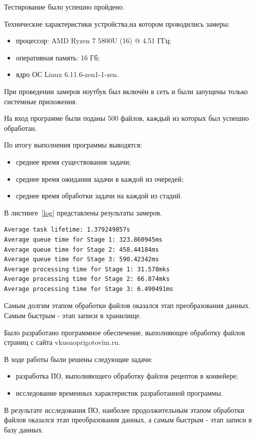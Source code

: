 Тестирование было успешно пройдено.

\clearpage
{}

Технические характеристики устройства,на котором проводились замеры:

\begin{itemize}
	\item процессор: AMD Ryzen 7 5800U (16) @ 4.51 ГГц;
	\item оперативная память: 16 Гб;
	\item ядро ОС Linux 6.11.6-zen1-1-zen.
\end{itemize}

При проведении замеров ноутбук был включён в сеть и были запущены только системные приложения.

На вход программе были поданы 500 файлов, каждый из которых был успешно обработан.

По итогу выполнения программы выводятся:

\begin{itemize}
    \item среднее время существования задачи;
    \item среднее время ожидания задачи в каждой из очередей;
    \item среднее время обработки задачи на каждой из стадий.
\end{itemize}

В листинге~\ref{log} представлены результаты замеров.

\begin{lstlisting}[label=log,caption={Данные журналирования}]
Average task lifetime: 1.379249857s
Average queue time for Stage 1: 323.860945ms
Average queue time for Stage 2: 458.44184ms
Average queue time for Stage 3: 590.42342ms
Average processing time for Stage 1: 31.578mks
Average processing time for Stage 2: 66.874mks
Average processing time for Stage 3: 6.490491ms
\end{lstlisting}

Самым долгим этапом обработки файлов оказался этап преобразования данных. Самым быстрым - этап записи в хранилище.

\clearpage
{}

Было разработано программное обеспечение, выполняющее обработку файлов страниц с сайта vkusnoprigotovim.ru.

В ходе работы были решены следующие задачи:

\begin{itemize}
	\item разработка ПО, выполняющего обработку файлов рецептов в конвейере;
    \item исследование временных характеристик разработанной программы.
\end{itemize}

В результате исследования ПО, наиболее продолжительным этапом обработки файлов оказался этап преобразования данных, а самым быстрым - этап записи в базу данных.
